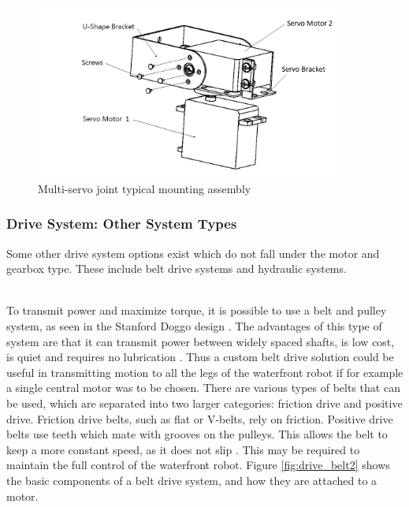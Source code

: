 \begin{figure}[H]
    \centering
    \includegraphics[width=0.9\textwidth]{Sections/LiteratureReview/img/LegAssembly/multi_servo_mounting.jpg}
    \caption{Multi-servo joint typical mounting assembly \cite{pololu_pololu_nodate}}
    \label{fig:multi-servo assembly}
\end{figure}

\subsubsection{Drive System: Other System Types}

Some other drive system options exist which do not fall under the motor and gearbox type. These include belt drive systems and hydraulic systems.

  \mbox{}\\
To transmit power and maximize torque, it is possible to use a belt and pulley system, as seen in the Stanford Doggo design \cite{kau_stanford_2019}. The advantages of this type of system are that it can transmit power between widely spaced shafts, is low cost, is quiet and requires no lubrication \cite{foszcz_basics_2001}. Thus a custom belt drive solution could be useful in transmitting motion to all the legs of the waterfront robot if for example a single central motor was to be chosen. There are various types of belts that can be used, which are separated into two larger categories: friction drive and positive drive. Friction drive belts, such as flat or V-belts, rely on friction. Positive drive belts use teeth which mate with grooves on the pulleys. This allows the belt to keep a more constant speed, as it does not slip \cite{convergence_training_belt_nodate}. This may be required to maintain the full control of the waterfront robot. Figure \ref{fig:drive_belt2} shows the basic components of a belt drive system, and how they are attached to a motor. 

